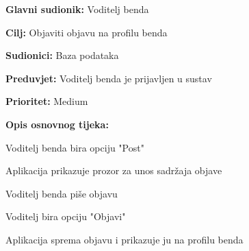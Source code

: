\noindent {}
	\begin{packed_item}
		
		\item \textbf{Glavni sudionik: } Voditelj benda
		\item \textbf{Cilj:} Objaviti objavu na profilu benda
		\item \textbf{Sudionici:} Baza podataka
		\item \textbf{Preduvjet:} Voditelj benda je prijavljen u sustav
		\item \textbf{Prioritet:} Medium
		\item \textbf{Opis osnovnog tijeka:} 
		
		\item[] \begin{packed_enum}
			
			\item Voditelj benda bira opciju "Post"
			\item Aplikacija prikazuje prozor za unos sadržaja objave
			\item Voditelj benda piše objavu
			\item Voditelj bira opciju "Objavi"
			\item Aplikacija sprema objavu i prikazuje ju na profilu benda
		\end{packed_enum}  
	\end{packed_item}

